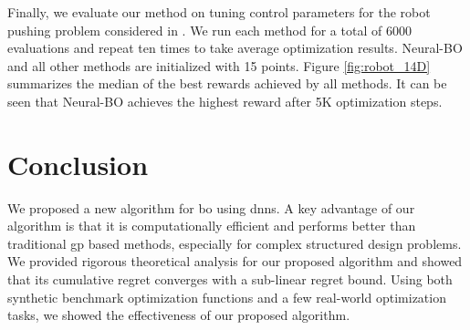 Finally, we evaluate our method on tuning control parameters for the robot pushing problem considered in \citet{wang2017max}. We run each method for a total of 6000 evaluations and repeat ten times to take average optimization results. Neural-BO and all other methods are initialized with 15 points. Figure \ref{fig:robot_14D} summarizes the median of the best rewards achieved by all methods. It can be seen that Neural-BO achieves the highest reward after 5K optimization steps. 

\section{Conclusion}
We proposed a new algorithm for \acl{bo} using \aclp{dnn}. A key advantage of our algorithm is that it is computationally efficient and performs better than traditional \acl{gp} based methods, especially for complex structured design problems. We provided rigorous theoretical analysis for our proposed algorithm and showed that its cumulative regret converges with a sub-linear regret bound. Using both synthetic benchmark optimization functions and a few real-world optimization tasks, we showed the effectiveness of our proposed algorithm. 